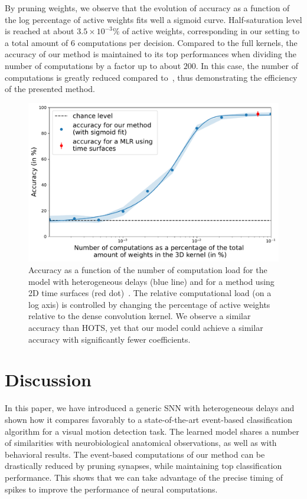 \documentclass[default]{sn-jnl}%
\theoremstyle{thmstyleone}%
\theoremstyle{thmstyletwo}%
\theoremstyle{thmstylethree}%
\begin{document}
By pruning weights, we observe that the evolution of accuracy as a function of the log percentage of active weights fits well a sigmoid curve. Half-saturation level is reached at about $3.5\times 10^{-3}\%$ of active weights, corresponding in our setting to a total amount of $6$ computations per decision. Compared to the full kernels, the accuracy of our method is maintained to its top performances when dividing the number of computations by a factor up to about $200$. In this case, the number of computations is greatly reduced compared to~\citep{grimaldi_robust_2022}, thus demonstrating the efficiency of the presented method. 
%
\begin{figure}%
    \centering
    \includegraphics[width=0.95\linewidth]{figures/accuracy.pdf}
    \caption{Accuracy as a function of the number of computation load for the model with heterogeneous delays (blue line) and for a method using 2D time surfaces (red dot)~\citep{grimaldi_robust_2022}. The relative computational load (on a log axis) is controlled by changing the percentage of active weights relative to the dense convolution kernel. We observe a similar accuracy than HOTS, yet that our model could achieve a similar accuracy with significantly fewer coefficients.}
    \label{fig:accuracy}
\end{figure}
%
\section{Discussion}
In this paper, we have introduced a generic SNN with heterogeneous delays and shown how it compares favorably to a state-of-the-art event-based classification algorithm for a visual motion detection task. The learned model shares a number of similarities with neurobiological anatomical observations, as well as with behavioral results. The event-based computations of our method can be drastically reduced by pruning synapses, while maintaining top classification performance. This shows that we can take advantage of the precise timing of spikes to improve the performance of neural computations.
%
\end{document}
